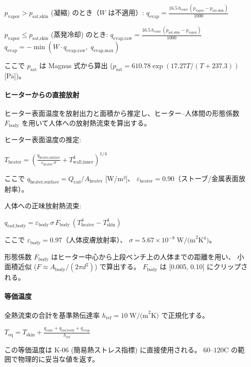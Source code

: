 \documentclass[a4paper,11pt]{article}
\begin{document}
$p_{\text{vapor}} > p_{\text{sat,skin}}$ (凝縮) のとき（$W$ は不適用）:
$
q_{\text{evap}} = \frac{16.5 \, h_{\text{conv}} \, (p_{\text{vapor}} - p_{\text{sat,skin}})}{1000}
$

$p_{\text{vapor}} \leq p_{\text{sat,skin}}$ (蒸発冷却) のとき:
$
q_{\text{evap,raw}} = \frac{16.5 \, h_{\text{conv}} \, (p_{\text{sat,skin}} - p_{\text{vapor}})}{1000}
$
$
q_{\text{evap}} = -\min(W \cdot q_{\text{evap,raw}}, \; q_{\text{evap,max}})
$

ここで $p_{\text{sat}}$ は Magnus 式から算出 ($p_{\text{sat}} = 610.78 \exp(17.27 T / (T + 237.3))$ [Pa])。

\paragraph{ヒーターからの直接放射}
ヒーター表面温度を放射出力と面積から推定し、ヒーター--人体間の形態係数 $F_{\text{body}}$
を用いて人体への放射熱流束を算出する。

ヒーター表面温度の推定:

$
T_{\text{heater}} = \left( \frac{q_{\text{heater,surface}}}{\varepsilon_{\text{heater}} \, \sigma} + T_{\text{wall,inner}}^4 \right)^{1/4}
$

ここで $q_{\text{heater,surface}} = Q_{\text{rad}} / A_{\text{heater}}$ [W/m²]、
$\varepsilon_{\text{heater}} = 0.90$（ストーブ/金属表面放射率）。

人体への正味放射熱流束:

$
q_{\text{rad,body}} = \varepsilon_{\text{body}} \, \sigma \, F_{\text{body}} \, (T_{\text{heater}}^4 - T_{\text{skin}}^4)
$

ここで $\varepsilon_{\text{body}} = 0.97$（人体皮膚放射率）、
$\sigma = 5.67 \times 10^{-8} \; \text{W/(m}^2\text{K}^4\text{)}$。

形態係数 $F_{\text{body}}$ はヒーター中心から上段ベンチ上の人体までの距離を用い、
小面積近似 ($F \approx A_{\text{body}} / (2\pi d^2)$) で算出する。
$F_{\text{body}}$ は [0.005, 0.10] にクリップされる。

\paragraph{等価温度}
全熱流束の合計を基準熱伝達率 $h_{\text{ref}} = 10 \; \text{W/(m}^2\text{K)}$ で正規化する。

$
T_{\text{eq}} = T_{\text{skin}} + \frac{q_{\text{conv}} + q_{\text{rad,body}} + q_{\text{evap}}}{h_{\text{ref}}}
$

この等価温度は K-06 (簡易熱ストレス指標) に直接使用される。
$60$--$120$\textdegree C の範囲で物理的に妥当な値を返す。
\end{document}
